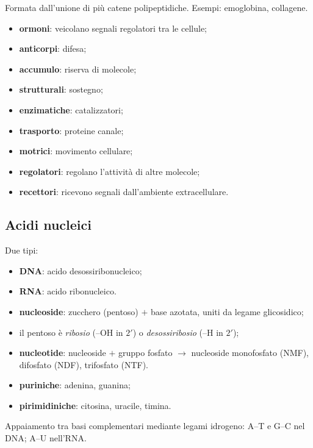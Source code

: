 Formata dall'unione di più catene polipeptidiche. Esempi: emoglobina, collagene.

\begin{itemize}
  \item \textbf{ormoni}: veicolano segnali regolatori tra le cellule;
  \item \textbf{anticorpi}: difesa;
  \item \textbf{accumulo}: riserva di molecole;
  \item \textbf{strutturali}: sostegno;
  \item \textbf{enzimatiche}: catalizzatori;
  \item \textbf{trasporto}: proteine canale;
  \item \textbf{motrici}: movimento cellulare;
  \item \textbf{regolatori}: regolano l'attività di altre molecole;
  \item \textbf{recettori}: ricevono segnali dall'ambiente extracellulare.
\end{itemize}

\subsection{Acidi nucleici}

Due tipi:
\begin{itemize}
  \item \textbf{DNA}: acido desossiribonucleico;
  \item \textbf{RNA}: acido ribonucleico.
\end{itemize}

\begin{itemize}
  \item \textbf{nucleoside}: zucchero (pentoso) $+$ base azotata, uniti da legame glicosidico;
  \item il pentoso è \textit{ribosio} (--OH in $2'$) o \textit{desossiribosio} (--H in $2'$);
  \item \textbf{nucleotide}: nucleoside $+$ gruppo fosfato $\rightarrow$ nucleoside monofosfato (NMF), difosfato (NDF), trifosfato (NTF).
\end{itemize}

\begin{itemize}
  \item \textbf{puriniche}: adenina, guanina;
  \item \textbf{pirimidiniche}: citosina, uracile, timina.
\end{itemize}
Appaiamento tra basi complementari mediante legami idrogeno: A--T e G--C nel DNA; A--U nell'RNA.

